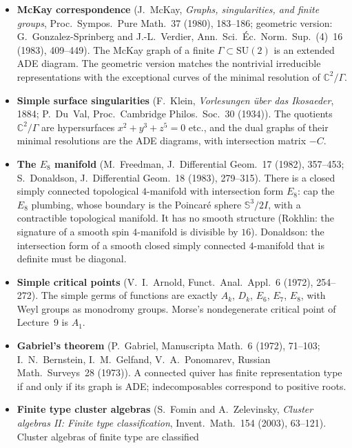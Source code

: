 \documentclass[11pt,openany]{book}
\theoremstyle{plain}
\theoremstyle{definition}
\theoremstyle{remark}
\newcommand{\R}{\mathbb{R}}
\newcommand{\C}{\mathbb{C}}
\newcommand{\Sph}{\mathbb{S}}          %
\begin{document}
\begin{itemize}[leftmargin=1.2em,itemsep=0.45em]
  Ryshkov--Baranovskii 1975 for $n=5$). The thinnest lattice covering of $\R^n$ for $n\le5$ is $A_n^*$. For
  $n=3$ it is BCC, the union of FCC with all of its holes. For $n\ge6$ the lattice covering problem is
  open.
\item \textbf{McKay correspondence} (J.~McKay, \emph{Graphs, singularities, and finite groups}, Proc.\
  Sympos.\ Pure Math.~37 (1980), 183--186; geometric version: G.~Gonzalez-Sprinberg and J.-L.~Verdier,
  Ann.\ Sci.\ \'Ec.\ Norm.\ Sup.\ (4)~16 (1983), 409--449). The McKay graph of a finite
  $\Gamma\subset\mathrm{SU}(2)$ is an extended ADE diagram. The geometric version matches the
  nontrivial irreducible representations with the exceptional curves of the minimal resolution of
  $\C^2/\Gamma$.
\item \textbf{Simple surface singularities} (F.~Klein, \emph{Vorlesungen \"uber das Ikosaeder}, 1884;
  P.~Du~Val, Proc.\ Cambridge Philos.\ Soc.~30 (1934)). The quotients $\C^2/\Gamma$ are hypersurfaces
  $x^2+y^3+z^5=0$ etc., and the dual graphs of their minimal resolutions are the ADE diagrams, with
  intersection matrix $-C$.
\item \textbf{The $E_8$ manifold} (M.~Freedman, J.\ Differential Geom.~17 (1982), 357--453;
  S.~Donaldson, J.\ Differential Geom.~18 (1983), 279--315). There is a closed simply connected
  topological $4$-manifold with intersection form $E_8$: cap the $E_8$ plumbing, whose boundary is the
  Poincar\'e sphere $\Sph^3/2I$, with a contractible topological manifold. It has no smooth structure
  (Rokhlin: the signature of a smooth spin $4$-manifold is divisible by $16$). Donaldson: the intersection form of a smooth closed
  simply connected $4$-manifold that is definite must be diagonal.
\item \textbf{Simple critical points} (V.~I.~Arnold, Funct.\ Anal.\ Appl.~6 (1972), 254--272). The simple
  germs of functions are exactly $A_k$, $D_k$, $E_6$, $E_7$, $E_8$, with Weyl groups as monodromy groups.
  Morse's nondegenerate critical point of Lecture~9 is $A_1$.
\item \textbf{Gabriel's theorem} (P.~Gabriel, Manuscripta Math.~6 (1972), 71--103; I.~N.~Bernstein,
  I.~M.~Gelfand, V.~A.~Ponomarev, Russian Math.\ Surveys~28 (1973)). A connected quiver has finite
  representation type if and only if its graph is ADE; indecomposables correspond to positive roots.
\item \textbf{Finite type cluster algebras} (S.~Fomin and A.~Zelevinsky, \emph{Cluster algebras II: Finite
  type classification}, Invent.\ Math.~154 (2003), 63--121). Cluster algebras of finite type are classified

\end{itemize}
\end{document}
